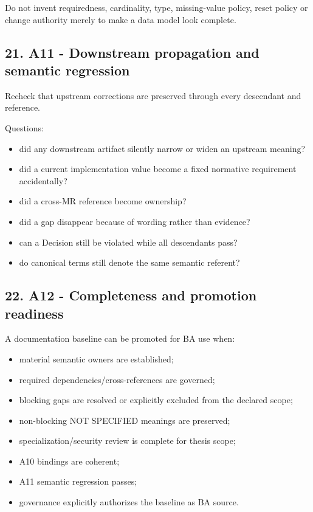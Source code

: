 \documentclass[11pt,a4paper]{article}
\providecommand{\tightlist}{\setlength{\itemsep}{0pt}\setlength{\parskip}{0pt}}
\begin{document}
Do not invent requiredness, cardinality, type, missing-value policy,
reset policy or change authority merely to make a data model look
complete.

\subsection{21. A11 - Downstream propagation and semantic
regression}\label{21-a11---downstream-propagation-and-semantic-regression}

Recheck that upstream corrections are preserved through every descendant
and reference.

Questions:

\begin{itemize}
\tightlist
\item
  did any downstream artifact silently narrow or widen an upstream
  meaning?
\item
  did a current implementation value become a fixed normative
  requirement accidentally?
\item
  did a cross-MR reference become ownership?
\item
  did a gap disappear because of wording rather than evidence?
\item
  can a Decision still be violated while all descendants pass?
\item
  do canonical terms still denote the same semantic referent?
\end{itemize}

\subsection{22. A12 - Completeness and promotion
readiness}\label{22-a12---completeness-and-promotion-readiness}

A documentation baseline can be promoted for BA use when:

\begin{itemize}
\tightlist
\item
  material semantic owners are established;
\item
  required dependencies/cross-references are governed;
\item
  blocking gaps are resolved or explicitly excluded from the declared
  scope;
\item
  non-blocking NOT SPECIFIED meanings are preserved;
\item
  specialization/security review is complete for thesis scope;
\item
  A10 bindings are coherent;
\item
  A11 semantic regression passes;
\item
  governance explicitly authorizes the baseline as BA source.
\end{itemize}
\end{document}
